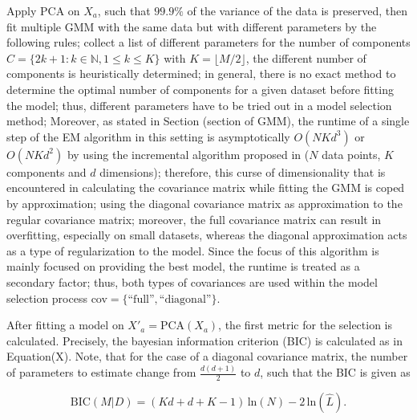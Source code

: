  Apply PCA on $X_a$, such that $99.9 \%$ of the variance of the data is preserved, then fit multiple GMM with the same data but with different parameters by the following rules; collect a list of different parameters for the number of components $C = \{2k+1: k \in \mathbb{N}, 1 \leq k \leq K\}$ with $K=\lfloor M / 2 \rfloor$, the different number of components is heuristically determined; in general, there is no exact method to determine the optimal number of components for a given dataset before fitting the model; thus, different parameters have to be tried out in a model selection method; Moreover, as stated in Section (section of GMM), the runtime of a single step of the EM algorithm in this setting is asymptotically $O(NKd^3)$ or $O(NKd^2)$ by using the incremental algorithm proposed in \cite{pinto2015fast} ($N$ data points, $K$ components and $d$ dimensions); therefore, this curse of dimensionality that is encountered in calculating the covariance matrix while fitting the GMM is coped by approximation; using the diagonal covariance matrix as approximation to the regular covariance matrix; moreover, the full covariance matrix can result in overfitting, especially on small datasets, whereas the diagonal approximation acts as a type of regularization to the model. Since the focus of this algorithm is mainly focused on providing the best model, the runtime is treated as a secondary factor; thus, both types of covariances are used within the model selection process cov$=\{\text{``full''}, \text{``diagonal''}\}$.

 After fitting a model on $X'_a = \text{PCA}(X_a)$, the first metric for the selection is calculated. Precisely, the bayesian information criterion (BIC) is calculated as in Equation(X). Note, that for the case of a diagonal covariance matrix, the number of parameters to estimate change from $\frac{d(d+1)}{2}$ to $d$, such that the BIC is given as 

 \begin{equation}
    \text{BIC}(M|D) = (Kd + d +K-1) \, \text{ln}(N) - 2 \, \text{ln}(\hat{L}).
\end{equation}



